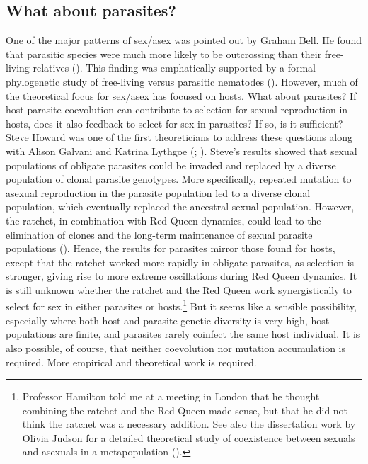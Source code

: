 \documentclass[
  letterpaper,
]{book}
\begin{document}
\subsection{What about parasites?}\label{what-about-parasites}

One of the major patterns of sex/asex was pointed out by Graham Bell. He
found that parasitic species were much more likely to be outcrossing
than their free-living relatives ().
This finding was emphatically supported by a formal phylogenetic study
of free-living versus parasitic nematodes
(). However, much of
the theoretical focus for sex/asex has focused on hosts. What about
parasites? If host-parasite coevolution can contribute to selection for
sexual reproduction in hosts, does it also feedback to select for sex in
parasites? If so, is it sufficient? Steve Howard was one of the first
theoreticians to address these questions along with Alison Galvani and
Katrina Lythgoe (; ). Steve's results
showed that sexual populations of obligate parasites could be invaded
and replaced by a diverse population of clonal parasite genotypes. More
specifically, repeated mutation to asexual reproduction in the parasite
population led to a diverse clonal population, which eventually replaced
the ancestral sexual population. However, the ratchet, in combination
with Red Queen dynamics, could lead to the elimination of clones and the
long-term maintenance of sexual parasite populations
(). Hence, the results
for parasites mirror those found for hosts, except that the ratchet
worked more rapidly in obligate parasites, as selection is stronger,
giving rise to more extreme oscillations during Red Queen dynamics. It
is still unknown whether the ratchet and the Red Queen work
synergistically to select for sex in either parasites or
hosts.\footnote{Professor Hamilton told me at a meeting in London that
  he thought combining the ratchet and the Red Queen made sense, but
  that he did not think the ratchet was a necessary addition. See also
  the dissertation work by Olivia Judson for a detailed theoretical
  study of coexistence between sexuals and asexuals in a metapopulation
  ().} But it seems like a
sensible possibility, especially where both host and parasite genetic
diversity is very high, host populations are finite, and parasites
rarely coinfect the same host individual. It is also possible, of
course, that neither coevolution nor mutation accumulation is required.
More empirical and theoretical work is required.
\end{document}
